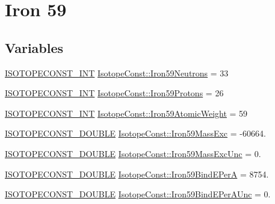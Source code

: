 \hypertarget{group___isotope_const-_iron-_fe59}{}\section{Iron 59}
\label{group___isotope_const-_iron-_fe59}
\subsection*{Variables}
\begin{DoxyCompactItemize}
\item 
\mbox{\hyperlink{group___isotope_const-_macros_ga5f18360b3e99483a35c32d789e62621c}{I\+S\+O\+T\+O\+P\+E\+C\+O\+N\+S\+T\+\_\+\+I\+NT}} \mbox{\hyperlink{group___isotope_const-_iron-_fe59_gab8b2d23d67d642c248459daa16503d80}{Isotope\+Const\+::\+Iron59\+Neutrons}} = 33
\item 
\mbox{\hyperlink{group___isotope_const-_macros_ga5f18360b3e99483a35c32d789e62621c}{I\+S\+O\+T\+O\+P\+E\+C\+O\+N\+S\+T\+\_\+\+I\+NT}} \mbox{\hyperlink{group___isotope_const-_iron-_fe59_ga41631ea4b64fc2c30dab39cf816ae444}{Isotope\+Const\+::\+Iron59\+Protons}} = 26
\item 
\mbox{\hyperlink{group___isotope_const-_macros_ga5f18360b3e99483a35c32d789e62621c}{I\+S\+O\+T\+O\+P\+E\+C\+O\+N\+S\+T\+\_\+\+I\+NT}} \mbox{\hyperlink{group___isotope_const-_iron-_fe59_ga647ca456271c890f7bd61881737064e1}{Isotope\+Const\+::\+Iron59\+Atomic\+Weight}} = 59
\item 
\mbox{\hyperlink{group___isotope_const-_macros_ga8f45a7272ce02c0b4c65c44636ed719a}{I\+S\+O\+T\+O\+P\+E\+C\+O\+N\+S\+T\+\_\+\+D\+O\+U\+B\+LE}} \mbox{\hyperlink{group___isotope_const-_iron-_fe59_ga4de7bdfec14040285c904d5813569e34}{Isotope\+Const\+::\+Iron59\+Mass\+Exc}} = -\/60664.
\item 
\mbox{\hyperlink{group___isotope_const-_macros_ga8f45a7272ce02c0b4c65c44636ed719a}{I\+S\+O\+T\+O\+P\+E\+C\+O\+N\+S\+T\+\_\+\+D\+O\+U\+B\+LE}} \mbox{\hyperlink{group___isotope_const-_iron-_fe59_gaf02397ae50eb6112be32af45dab724b6}{Isotope\+Const\+::\+Iron59\+Mass\+Exc\+Unc}} = 0.
\item 
\mbox{\hyperlink{group___isotope_const-_macros_ga8f45a7272ce02c0b4c65c44636ed719a}{I\+S\+O\+T\+O\+P\+E\+C\+O\+N\+S\+T\+\_\+\+D\+O\+U\+B\+LE}} \mbox{\hyperlink{group___isotope_const-_iron-_fe59_ga67904c155ae65bc3f72083d78de4b9e1}{Isotope\+Const\+::\+Iron59\+Bind\+E\+PerA}} = 8754.
\item 
\mbox{\hyperlink{group___isotope_const-_macros_ga8f45a7272ce02c0b4c65c44636ed719a}{I\+S\+O\+T\+O\+P\+E\+C\+O\+N\+S\+T\+\_\+\+D\+O\+U\+B\+LE}} \mbox{\hyperlink{group___isotope_const-_iron-_fe59_ga6787cf7ed80a97e5fc1f93d08903fe89}{Isotope\+Const\+::\+Iron59\+Bind\+E\+Per\+A\+Unc}} = 0.

\end{DoxyCompactItemize}
